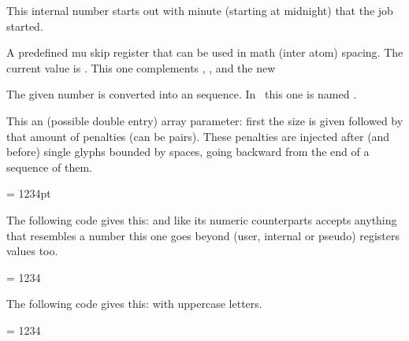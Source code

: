 \stopoldprimitive

\startoldprimitive[title={\prm {time}}]

This internal number starts out with minute (starting at midnight) that the job
started.

\stopoldprimitive

\startnewprimitive[title={\prm {tinymuskip}}]

A predefined mu skip register that can be used in math (inter atom) spacing. The
current value is {\tt \the\tinymuskip}. This one complements ,
,  and the new 

\stopnewprimitive

\startnewprimitive[title={\prm {tocharacter}}]

The given number is converted into an  sequence. In \LUATEX\ this one is
named \type {\Uchar}.

\stopnewprimitive

\startnewprimitive[title={\prm {toddlerpenalties}}]

This an (possible double entry) array parameter: first the size is given followed
by that amount of penalties (can be pairs). These penalties are injected after
(and before) single glyphs bounded by spaces, going backward from the end of a
sequence of them.

\stopnewprimitive

\startnewprimitive[title={\prm {todimension}}]

\startbuffer
\scratchdimen = 1234pt \todimension\scratchdimen
\stopbuffer

The following code gives this: {\nospacing\inlinebuffer} and like its numeric
counterparts accepts anything that resembles a number this one goes beyond
(user, internal or pseudo) registers values too.

\typebuffer

\stopnewprimitive

\startnewprimitive[title={\prm {tohexadecimal}}]

\startbuffer
\scratchcounter = 1234 \tohexadecimal\scratchcounter
\stopbuffer

The following code gives this: {\nospacing\inlinebuffer} with uppercase letters.

\typebuffer

\stopnewprimitive

\startnewprimitive[title={\prm {tointeger}}]

\startbuffer
\scratchcounter = 1234 \tointeger\scratchcounter
\stopbuffer

